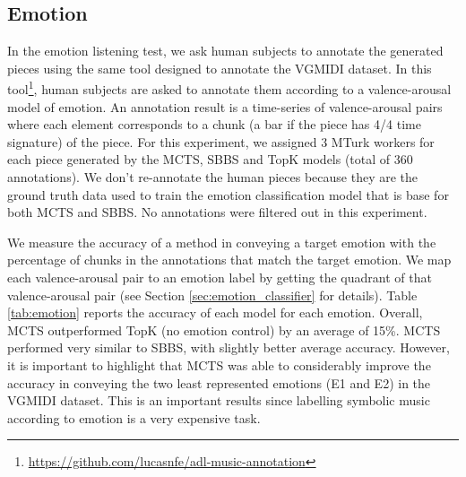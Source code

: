 
\subsection{Emotion}

In the emotion listening test, we ask human subjects to annotate the generated pieces using the same tool designed to annotate the VGMIDI dataset. In this tool\footnote{\url{https://github.com/lucasnfe/adl-music-annotation}}, human subjects
are asked to annotate them according to a valence-arousal model of emotion. An annotation result is a time-series of valence-arousal pairs where each element corresponds to a chunk (a bar if the piece has 4/4 time signature) of the piece. For this experiment, we assigned 3 MTurk workers for each piece generated by the MCTS, SBBS and TopK models (total of 360 annotations). We don't re-annotate the human pieces because they are the ground truth data used to train the emotion classification model that is base for both MCTS and SBBS. No annotations were filtered out in this experiment.

We measure the accuracy of a method in conveying a target emotion with the
percentage of chunks in the annotations that match the target emotion. We map each
valence-arousal pair to an emotion label by getting the quadrant of that valence-arousal pair
(see Section \ref{sec:emotion_classifier} for details).  Table \ref{tab:emotion} reports
the accuracy of each model for each emotion. Overall, MCTS outperformed TopK (no emotion control) by an average of 15\%. MCTS performed very similar to SBBS, with slightly better average accuracy. However, it is important to highlight that MCTS was able to considerably
improve the accuracy in conveying the two least represented emotions (E1 and E2) in the
VGMIDI dataset. This is an important results since labelling symbolic music according to emotion is a very expensive task.

